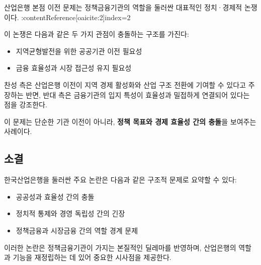 산업은행 본점 이전 문제는 정책금융기관의 역할을 둘러싼 대표적인 정치·경제적 논쟁이다. :contentReference[oaicite:2]{index=2}  

이 논쟁은 다음과 같은 두 가지 관점이 충돌하는 구조를 가진다:

\begin{itemize}
    \item 지역균형발전을 위한 공공기관 이전 필요성
    \item 금융 효율성과 시장 접근성 유지 필요성
\end{itemize}

찬성 측은 산업은행 이전이 지역 경제 활성화와 산업 구조 전환에 기여할 수 있다고 주장하는 반면,  
반대 측은 금융기관의 입지 특성이 효율성과 밀접하게 연결되어 있다는 점을 강조한다.

이 문제는 단순한 기관 이전이 아니라, \textbf{정책 목표와 경제 효율성 간의 충돌}을 보여주는 사례이다.

\subsection{소결}

한국산업은행을 둘러싼 주요 논란은 다음과 같은 구조적 문제로 요약할 수 있다:

\begin{itemize}
    \item 공공성과 효율성 간의 충돌
    \item 정치적 통제와 경영 독립성 간의 긴장
    \item 정책금융과 시장금융 간의 역할 경계 문제
\end{itemize}

이러한 논란은 정책금융기관이 가지는 본질적인 딜레마를 반영하며, 산업은행의 역할과 기능을 재정립하는 데 있어 중요한 시사점을 제공한다.
